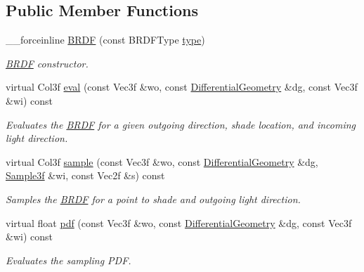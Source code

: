\subsection*{Public Member Functions}
\begin{DoxyCompactItemize}
\item 
\_\-\_\-forceinline \hyperlink{classembree_1_1_b_r_d_f_a00b5f8cc7475f588a63f20dd94272e7f}{BRDF} (const BRDFType \hyperlink{classembree_1_1_b_r_d_f_a4951cd2b8b2d2ab69e1e1f5819c7dcf5}{type})
\begin{DoxyCompactList}\small\item\em \hyperlink{classembree_1_1_b_r_d_f}{BRDF} constructor. \item\end{DoxyCompactList}\item 
virtual Col3f \hyperlink{classembree_1_1_b_r_d_f_a0c9f743878ab59613073c63772075b4f}{eval} (const Vec3f \&wo, const \hyperlink{structembree_1_1_differential_geometry}{DifferentialGeometry} \&dg, const Vec3f \&wi) const 
\begin{DoxyCompactList}\small\item\em Evaluates the \hyperlink{classembree_1_1_b_r_d_f}{BRDF} for a given outgoing direction, shade location, and incoming light direction. \item\end{DoxyCompactList}\item 
virtual Col3f \hyperlink{classembree_1_1_b_r_d_f_a6eb1a114a4f36dc2c1ad65bcbce5f809}{sample} (const Vec3f \&wo, const \hyperlink{structembree_1_1_differential_geometry}{DifferentialGeometry} \&dg, \hyperlink{structembree_1_1_sample}{Sample3f} \&wi, const Vec2f \&s) const 
\begin{DoxyCompactList}\small\item\em Samples the \hyperlink{classembree_1_1_b_r_d_f}{BRDF} for a point to shade and outgoing light direction. \item\end{DoxyCompactList}\item 
virtual float \hyperlink{classembree_1_1_b_r_d_f_a99b2d76b1283764f67df2f582f4519a2}{pdf} (const Vec3f \&wo, const \hyperlink{structembree_1_1_differential_geometry}{DifferentialGeometry} \&dg, const Vec3f \&wi) const 
\begin{DoxyCompactList}\small\item\em Evaluates the sampling PDF. \item\end{DoxyCompactList}\end{DoxyCompactItemize}
